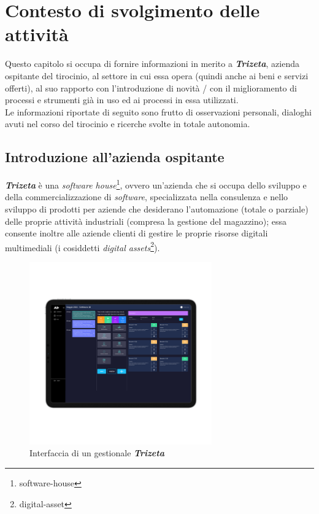 \chapter{Contesto di svolgimento delle attività}
\label{cap:contesto-svolgimento}

Questo capitolo si occupa di fornire informazioni in merito a \textit{\textbf{Trizeta}}, azienda ospitante del tirocinio, al settore in cui essa opera (quindi anche ai beni e servizi offerti), 
al suo rapporto con l'introduzione di novità / con il miglioramento di processi e strumenti già in uso ed ai processi in essa utilizzati. \\
Le informazioni riportate di seguito sono frutto di osservazioni personali, dialoghi avuti nel corso del tirocinio e ricerche svolte in totale autonomia.

\section{Introduzione all'azienda ospitante}

\textit{\textbf{Trizeta}} è una \textit{software house}\footnote{\gls{software-house}}, ovvero un'azienda che si occupa dello sviluppo e della commercializzazione di \textit{software}, specializzata nella consulenza e nello sviluppo
di prodotti per aziende che desiderano l'automazione (totale o parziale) delle proprie attività industriali (compresa la gestione del magazzino); essa consente inoltre alle aziende clienti di gestire le proprie risorse digitali multimediali (i cosiddetti \textit{digital assets}\footnote{\gls{digital-asset}}).
\vspace{-20mm}
    \begin{figure}[H]
        \centering
        \includegraphics[width=0.7\textwidth]{images/adesuite.png}
        \vspace{-15mm}
        \caption[Interfaccia di un gestionale \textit{\textbf{Trizeta}}]{Interfaccia di un gestionale \textit{\textbf{Trizeta}}\footnotemark}
    \end{figure}

